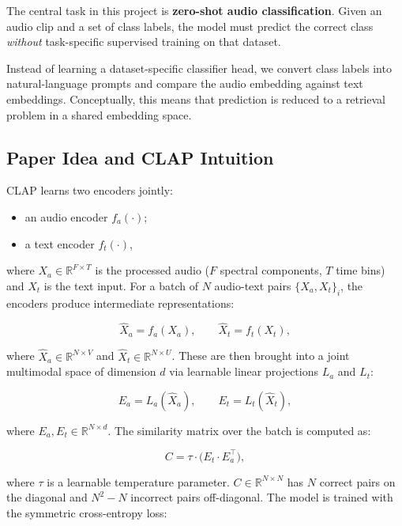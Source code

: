 \documentclass[11pt]{article}
\begin{document}
The central task in this project is \textbf{zero-shot audio classification}.
Given an audio clip and a set of class labels, the model must predict the
correct class \emph{without} task-specific supervised training on that dataset.

Instead of learning a dataset-specific classifier head, we convert class labels
into natural-language prompts and compare the audio embedding against text
embeddings. Conceptually, this means that prediction is reduced to a retrieval
problem in a shared embedding space.

\subsection{Paper Idea and CLAP Intuition}

CLAP learns two encoders jointly:
\begin{itemize}[leftmargin=1.25em]
  \item an audio encoder $f_a(\cdot)$;
  \item a text encoder $f_t(\cdot)$,
\end{itemize}
where $X_a \in \mathbb{R}^{F \times T}$ is the processed audio ($F$ spectral
components, $T$ time bins) and $X_t$ is the text input. For a batch of $N$
audio-text pairs $\{X_a, X_t\}_i$, the encoders produce intermediate
representations:

\begin{equation}
\hat{X}_a = f_a(X_a), \qquad \hat{X}_t = f_t(X_t),
\end{equation}

where $\hat{X}_a \in \mathbb{R}^{N \times V}$ and $\hat{X}_t \in \mathbb{R}^{N
\times U}$. These are then brought into a joint multimodal space of dimension
$d$ via learnable linear projections $L_a$ and $L_t$:

\begin{equation}
E_a = L_a(\hat{X}_a), \qquad E_t = L_t(\hat{X}_t),
\end{equation}

where $E_a, E_t \in \mathbb{R}^{N \times d}$. The similarity matrix over the
batch is computed as:

\begin{equation}
C = \tau \cdot \bigl(E_t \cdot E_a^{\top}\bigr),
\end{equation}

where $\tau$ is a learnable temperature parameter. $C \in \mathbb{R}^{N \times
N}$ has $N$ correct pairs on the diagonal and $N^2 - N$ incorrect pairs
off-diagonal. The model is trained with the symmetric cross-entropy loss:
\end{document}
